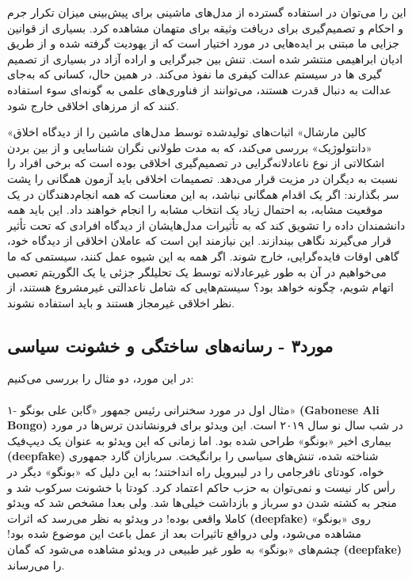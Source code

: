 این را می‌توان در استفاده گسترده از مدل‌های ماشینی برای پیش‌بینی میزان تکرار جرم و احکام و تصمیم‌گیری برای دریافت وثیقه برای متهمان مشاهده کرد.
بسیاری از قوانین جزایی ما مبتنی بر ایده‌هایی در مورد اختیار است که از یهودیت گرفته شده و از طریق ادیان ابراهیمی منتشر شده است.
تنش بین جبرگرایی و اراده آزاد در بسیاری از تصمیم گیری ها در سیستم عدالت کیفری ما نفوذ می‌کند.
در همین حال، کسانی که به‌جای عدالت به دنبال قدرت هستند، می‌توانند از فناوری‌های علمی به گونه‌ای سوء استفاده کنند که از مرزهای اخلاقی خارج شود.

«کالین مارشال» اثبات‌های تولیدشده توسط مدل‌های ماشین را از دیدگاه اخلاق «دانتولوژیک» بررسی می‌کند، که به مدت طولانی نگران شناسایی و از بین بردن اشکالاتی از نوع ناعادلانه‌گرایی در تصمیم‌گیری اخلاقی بوده است که برخی افراد را نسبت به دیگران در مزیت قرار می‌دهد.
تصمیمات اخلاقی باید آزمون همگانی را پشت سر بگذارند: اگر یک اقدام همگانی نباشد، به این معناست که همه انجام‌دهندگان در یک موقعیت مشابه، به احتمال زیاد یک انتخاب مشابه را انجام خواهند داد.
این باید همه دانشمندان داده را تشویق کند که به تأثیرات مدل‌هایشان از دیدگاه افرادی که تحت تأثیر قرار می‌گیرند نگاهی بیندازند.
این نیازمند این است که عاملان اخلاقی از دیدگاه خود، گاهی اوقات فایده‌گرایی، خارج شوند.
اگر همه به این شیوه عمل کنند، سیستمی که ما می‌خواهیم در آن به طور غیرعادلانه توسط یک تحلیلگر جزئی یا یک الگوریتم تعصبی اتهام شویم، چگونه خواهد بود؟ سیستم‌هایی که شامل ناعدالتی غیرمشروع هستند، از نظر اخلاقی غیرمجاز هستند و باید استفاده نشوند.

\subsection*{مورد۳ - رسانه‌های ساختگی و خشونت سیاسی}
\label{subsec:مورد۳ - رسانه‌های ساختگی و خشونت سیاسی}
در این مورد، دو مثال را بررسی می‌کنیم:

\paragraph{}
۱- مثال اول در مورد سخنرانی رئیس جمهور «گابن علی بونگو» \textenglish{\textbf{(Gabonese Ali Bongo)}} در شب سال نو سال ۲۰۱۹ است.
این ویدئو برای فرونشاندن ترس‌ها در مورد بیماری اخیر «بونگو» طراحی شده بود.
اما زمانی که این ویدئو به عنوان یک دیپ‌فیک \textenglish{\textbf{(deepfake)}} شناخته شده، تنش‌های سیاسی را برانگیخت.
سربازان گارد جمهوری خواه، کودتای نافرجامی را در لیبرویل راه انداختند؛ به این دلیل که «بونگو» دیگر در رأس کار نیست و نمی‌توان به حزب حاکم اعتماد کرد.
کودتا با خشونت سرکوب شد و منجر به کشته شدن دو سرباز و بازداشت خیلی‌ها شد.
ولی بعدا مشخص شد که ویدئو کاملا واقعی بوده!
در ویدئو به نظر می‌رسد که اثرات \textenglish{\textbf{(deepfake)}} روی «بونگو» مشاهده می‌شود، ولی درواقع تاثیرات بعد از عمل باعث این موضوع شده بود!
چشم‌های «بونگو» به طور غیر طبیعی در ویدئو مشاهده می‌شود که گمان \textenglish{\textbf{(deepfake)}} را می‌رساند.

